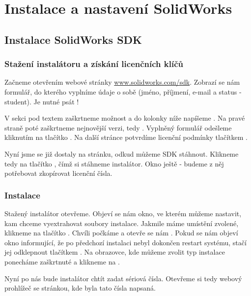 \chapter{Instalace a nastavení SolidWorks}
\section{Instalace SolidWorks SDK}

\subsection*{Stažení instalátoru a získání licenčních klíčů}
Začneme otevřením webové stránky \href{http://www.solidworks.com/sdk}{www.solidworks.com/sdk}.
Zobrazí se nám formulář, do kterého vyplníme údaje o sobě (jméno, příjmení, e-mail a status - student).
Je nutné psát !

\fxnote[author=PŠ]{\textcolor{mygreen}{Sem přijde screenshot formuláře}}

V sekci  pod textem  zaškrtneme možnost  a do kolonky níže napíšeme .
Na pravé straně poté zaškrtneme nejnovější verzi, tedy .
Vyplněný formulář odešleme kliknutím na tlačítko .
Na další stránce potvrdíme licenční podmínky tlačítkem .

Nyní jsme se již dostaly na stránku, odkud můžeme SDK stáhnout.
Klikneme tedy na tlačítko , čímž si stáhneme instalátor.
Okno ještě  - budeme z něj potřebovat zkopírovat licenční čísla. 

\subsection*{Instalace}
Stažený instalátor otevřeme. 
Objeví se nám okno, ve kterém můžeme nastavit, kam chceme vyextrahovat soubory instalace.
Jakmile máme umístění zvolené, klikneme na tlačítko .
Chvíli počkáme a otevře se nám .
Pokud se nám objeví okno informující, že po předchozí instalaci nebyl dokončen restart systému, stačí jej odklepnout tlačítkem .
Na obrazovce, kde můžeme zvolit typ instalace ponecháme zaškrtnuté  a klikneme na .

Nyní po nás bude instalátor chtít zadat sériová čísla. 
Otevřeme si tedy webový prohlížeč se stránkou, kde byla tato čísla napsaná.


